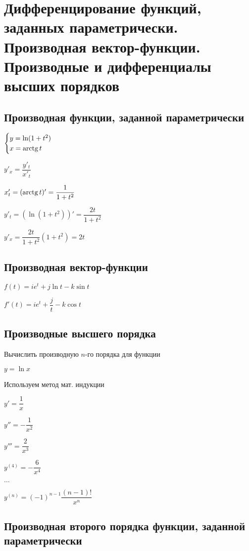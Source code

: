 \section{Дифференцирование функций, заданных параметрически. Производная вектор-функции. Производные и дифференциалы высших порядков}

\subsection{Производная функции, заданной параметрически}

$\begin{cases}
y = \ln (1+t^{2}) \\
x = \operatorname{arctg} t
\end{cases}$

$ y'_{x} = \dfrac{y'_{t}}{x'_{t}} $

$ x'_{t} = (\operatorname{arctg} t)' = \dfrac{1}{1+t^{2}} $

$ y'_{t} = (\ln (1+t^{2}))' = \dfrac{2t}{1+t^{2}} $

$ y'_{x} = \dfrac{2t}{1+t^{2}} (1+t^{2}) = 2t $

\subsection{Производная вектор-функции}

$ f(t) = ie^{t} + j \ln t  - k\sin t $

$ f'(t) = ie^{t} + \dfrac{j}{t}  - k \cos t $

\subsection{Производные высшего порядка}

Вычислить производную $ n $-го порядка для функции

$ y = \ln x $

Используем метод мат. индукции

$ y' = \dfrac{1}{x} $

$ y'' = -\dfrac{1}{x^{2}} $

$ y''' = \dfrac{2}{x^{3}} $

$ y^{(4)} = -\dfrac{6}{x^{4}} $

$ \ldots $

$ y^{(n)} = (-1)^{n-1}\dfrac{(n-1)!}{x^{n}} $

\subsection{Производная второго порядка функции, заданной параметрически}

